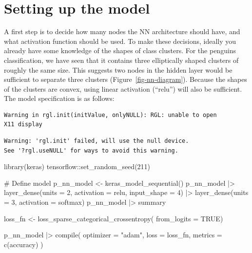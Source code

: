 \documentclass[
  letterpaper,
]{krantz}
\newenvironment{Shaded}{\begin{snugshade}}{\end{snugshade}}
\newcommand{\AttributeTok}[1]{\textcolor[rgb]{0.40,0.45,0.13}{#1}}
\newcommand{\CommentTok}[1]{\textcolor[rgb]{0.37,0.37,0.37}{#1}}
\newcommand{\ConstantTok}[1]{\textcolor[rgb]{0.56,0.35,0.01}{#1}}
\newcommand{\DecValTok}[1]{\textcolor[rgb]{0.68,0.00,0.00}{#1}}
\newcommand{\FunctionTok}[1]{\textcolor[rgb]{0.28,0.35,0.67}{#1}}
\newcommand{\NormalTok}[1]{\textcolor[rgb]{0.00,0.23,0.31}{#1}}
\newcommand{\OtherTok}[1]{\textcolor[rgb]{0.00,0.23,0.31}{#1}}
\newcommand{\SpecialCharTok}[1]{\textcolor[rgb]{0.37,0.37,0.37}{#1}}
\newcommand{\StringTok}[1]{\textcolor[rgb]{0.13,0.47,0.30}{#1}}
\begin{document}
\section{Setting up the model}\label{sec-nn-model}


A first step is to decide how many nodes the NN architecture should
have, and what activation function should be used. To make these
decisions, ideally you already have some knowledge of the shapes of
class clusters. For the penguins classification, we have seen that it
contains three elliptically shaped clusters of roughly the same size.
This suggests two nodes in the hidden layer would be sufficient to
separate three clusters (Figure~\ref{fig-nn-diagram}). Because the
shapes of the clusters are convex, using linear activation (``relu'')
will also be sufficient. The model specification is as follows:

\begin{verbatim}
Warning in rgl.init(initValue, onlyNULL): RGL: unable to open
X11 display
\end{verbatim}

\begin{verbatim}
Warning: 'rgl.init' failed, will use the null device.
See '?rgl.useNULL' for ways to avoid this warning.
\end{verbatim}

\begin{Shaded}
\begin{Highlighting}[]
\FunctionTok{library}\NormalTok{(keras)}
\NormalTok{tensorflow}\SpecialCharTok{::}\FunctionTok{set\_random\_seed}\NormalTok{(}\DecValTok{211}\NormalTok{)}

\CommentTok{\# Define model}
\NormalTok{p\_nn\_model }\OtherTok{\textless{}{-}} \FunctionTok{keras\_model\_sequential}\NormalTok{()}
\NormalTok{p\_nn\_model }\SpecialCharTok{|\textgreater{}} 
  \FunctionTok{layer\_dense}\NormalTok{(}\AttributeTok{units =} \DecValTok{2}\NormalTok{, }\AttributeTok{activation =} \StringTok{\textquotesingle{}relu\textquotesingle{}}\NormalTok{, }
              \AttributeTok{input\_shape =} \DecValTok{4}\NormalTok{) }\SpecialCharTok{|\textgreater{}} 
  \FunctionTok{layer\_dense}\NormalTok{(}\AttributeTok{units =} \DecValTok{3}\NormalTok{, }\AttributeTok{activation =} \StringTok{\textquotesingle{}softmax\textquotesingle{}}\NormalTok{)}
\NormalTok{p\_nn\_model }\SpecialCharTok{|\textgreater{}}\NormalTok{ summary}

\NormalTok{loss\_fn }\OtherTok{\textless{}{-}} \FunctionTok{loss\_sparse\_categorical\_crossentropy}\NormalTok{(}
  \AttributeTok{from\_logits =} \ConstantTok{TRUE}\NormalTok{)}

\NormalTok{p\_nn\_model }\SpecialCharTok{|\textgreater{}} \FunctionTok{compile}\NormalTok{(}
  \AttributeTok{optimizer =} \StringTok{"adam"}\NormalTok{,}
  \AttributeTok{loss      =}\NormalTok{ loss\_fn,}
  \AttributeTok{metrics   =} \FunctionTok{c}\NormalTok{(}\StringTok{\textquotesingle{}accuracy\textquotesingle{}}\NormalTok{)}
\NormalTok{)}
\end{Highlighting}
\end{Shaded}
\end{document}
